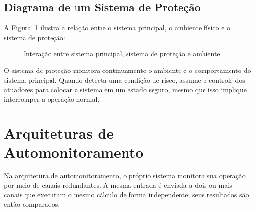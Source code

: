 \documentclass[12pt,a4paper]{report}
\begin{document}
\subsection{Diagrama de um Sistema de Proteção}

A Figura~\ref{fig:sistema-protecao} ilustra a relação entre o sistema
principal, o ambiente físico e o sistema de proteção:

\begin{figure}[h]
    \centering
    \caption{Interação entre sistema principal, sistema de proteção e ambiente}
    \label{fig:sistema-protecao}
\end{figure}

O sistema de proteção monitora continuamente o ambiente e o comportamento do
sistema principal. Quando detecta uma condição de risco, assume o controle
dos atuadores para colocar o sistema em um estado seguro, mesmo que isso
implique interromper a operação normal.

\section{Arquiteturas de Automonitoramento}

Na arquitetura de automonitoramento, o próprio sistema monitora sua operação
por meio de canais redundantes. A mesma entrada é enviada a dois ou mais
canais que executam o mesmo cálculo de forma independente; seus resultados
são então comparados.
\end{document}
